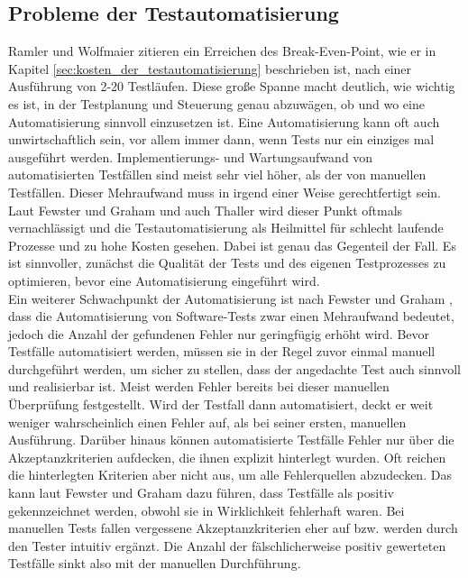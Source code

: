 \subsection{Probleme der Testautomatisierung}
\label{sec:probleme_der_testautomatisierung}
Ramler und Wolfmaier \cite{ramler_economic_2006} zitieren ein Erreichen des Break-Even-Point, wie er in Kapitel \ref{sec:kosten_der_testautomatisierung} beschrieben ist, nach einer Ausführung von 2-20 Testläufen. Diese große Spanne macht deutlich, wie wichtig es ist, in der Testplanung und Steuerung genau abzuwägen, ob und wo eine Automatisierung sinnvoll einzusetzen ist. Eine Automatisierung kann oft auch unwirtschaftlich sein, vor allem immer dann, wenn Tests nur ein einziges mal ausgeführt werden. Implementierungs- und Wartungsaufwand von automatisierten Testfällen sind meist sehr viel höher, als der von manuellen Testfällen. Dieser Mehraufwand muss in irgend einer Weise gerechtfertigt sein. Laut Fewster und Graham \cite[vgl. S. 22 ff.]{fewster_software_1999} und auch Thaller \cite[vgl. S.230 ff.]{thaller_software-test_2002} wird dieser Punkt oftmals vernachlässigt und die Testautomatisierung als Heilmittel für schlecht laufende Prozesse und zu hohe Kosten gesehen. Dabei ist genau das Gegenteil der Fall. Es ist sinnvoller, zunächst die Qualität der Tests und des eigenen Testprozesses zu optimieren, bevor eine Automatisierung eingeführt wird.\\ 
Ein weiterer Schwachpunkt der Automatisierung ist nach Fewster und Graham \cite[vgl. S. 22 ff.]{fewster_software_1999}, dass die Automatisierung von Software-Tests zwar einen Mehraufwand bedeutet, jedoch die Anzahl der gefundenen Fehler nur geringfügig erhöht wird.
Bevor Testfälle automatisiert werden, müssen sie in der Regel zuvor einmal manuell durchgeführt werden, um sicher zu stellen, dass der angedachte Test auch sinnvoll und realisierbar ist. Meist werden Fehler bereits bei dieser manuellen Überprüfung festgestellt. Wird der Testfall dann automatisiert, deckt er weit weniger wahrscheinlich einen Fehler auf, als bei seiner ersten, manuellen Ausführung. Darüber hinaus können automatisierte Testfälle Fehler nur über die Akzeptanzkriterien aufdecken, die ihnen explizit hinterlegt wurden. Oft reichen die hinterlegten Kriterien aber nicht aus, um alle Fehlerquellen abzudecken. Das kann laut Fewster und Graham \cite[vgl. S. 23 ff.]{fewster_software_1999} dazu führen, dass Testfälle als positiv gekennzeichnet werden, obwohl sie in Wirklichkeit fehlerhaft waren. Bei manuellen Tests fallen vergessene Akzeptanzkriterien eher auf bzw. werden durch den Tester intuitiv ergänzt. Die Anzahl der fälschlicherweise positiv gewerteten Testfälle sinkt also mit der manuellen Durchführung.\\
